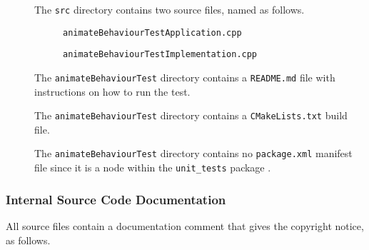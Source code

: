 \documentclass{CSSRforAfrica}
\newcommand{\checkboxChecked}{\fbox{\ding{51}}} %
\begin{document}
\begin{description}
\item[\checkboxChecked] The  {\small \verb+src+} directory contains two source files, named as follows.
\begin{description}
\item[\checkboxChecked] {\small \verb+animateBehaviourTestApplication.cpp+}  
\item[\checkboxChecked]  {\small \verb+animateBehaviourTestImplementation.cpp+}  
\end{description} 

\item[\checkboxChecked] The {\small \verb+animateBehaviourTest+} directory contains  a {\small \verb+README.md+} file with  instructions on how to run the test. 
\item[\checkboxChecked] The {\small \verb+animateBehaviourTest+} directory contains  a {\small \verb+CMakeLists.txt+} build file.
\item[\checkboxChecked] The {\small \verb+animateBehaviourTest+} directory contains  no {\small \verb+package.xml+} manifest file since it is a node within the {\small \verb+unit_tests+} package .

\end{description}


 
 
\subsubsection{Internal Source Code Documentation}
\label{subsubsection:animate_behaviour_test_documentation_standards}  

\noindent All source files contain a documentation comment that gives the copyright notice, as follows.
 
\end{document}
